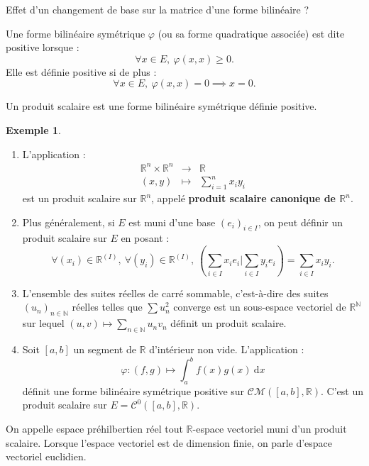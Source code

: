 \documentclass[french]{article}
\newcommand{\N}{\mathbb{N}}
\newcommand{\R}{\mathbb{R}}
\renewcommand{\d}{\text{d}}
\theoremstyle{plain}
\theoremstyle{definition}
\newtheorem*{ex}{Exemple}
\theoremstyle{remark}
\begin{document}
\begin{exo}
	Effet d'un changement de base sur la matrice d'une forme bilinéaire ?
\end{exo}

\begin{dfn}
	Une forme bilinéaire symétrique $\varphi$ (ou sa forme quadratique associée) est dite positive lorsque : $$\forall x\in E,\ \varphi(x,x)\geqslant 0.$$ Elle est définie positive si de plus : $$\forall x\in E,\ \varphi(x,x)=0\implies x=0.$$
\end{dfn}

\begin{dfn}
	Un produit scalaire est une forme bilinéaire symétrique définie positive.
\end{dfn}

\begin{ex}
	\begin{enumerate}
		\item L'application : $$\begin{array}{rcl}
			\R^n\times\R^n&\longrightarrow&\R \\
			(x,y)&\longmapsto&\displaystyle\sum_{i=1}^{n}x_iy_i
		\end{array}$$ est un produit scalaire sur $\R^n$, appelé \textbf{produit scalaire canonique de $\R^n$}.
		\item Plus généralement, si $E$ est muni d'une base $(e_i)_{i\in I}$, on peut définir un produit scalaire sur $E$ en posant : $$\forall (x_i)\in\R^{(I)},\ \forall (y_i)\in\R^{(I)},\ \left(\sum_{i\in I}x_ie_i\bigg| \sum_{i\in I} y_ie_i\right)=\sum_{i\in I}x_iy_i.$$
		\item L'ensemble des suites réelles de carré sommable, c'est-à-dire des suites $(u_n)_{n\in\N}$ réelles telles que $\sum u_n^2$ converge est un sous-espace vectoriel de $\R^\N$ sur lequel $(u,v)\mapsto\displaystyle\sum_{n\in\N}u_nv_n$ définit un produit scalaire.
		\item Soit $[a,b]$ un segment de $\R$ d'intérieur non vide. L'application : $$\varphi:(f,g)\mapsto\int_{a}^{b}f(x)g(x)\ \d x$$ définit une forme bilinéaire symétrique positive sur $\mathcal{CM}([a,b],\R)$. C'est un produit scalaire sur $E=\mathcal{C}^0([a,b],\R)$.
	\end{enumerate}
\end{ex}

\begin{dfn}
	On appelle espace préhilbertien réel tout $\R$-espace vectoriel muni d'un produit scalaire. Lorsque l'espace vectoriel est de dimension finie, on parle d'espace vectoriel euclidien.
\end{dfn}
\end{document}
